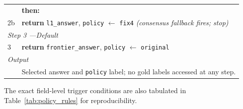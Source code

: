 \begin{table}[t]
\begin{tabular}{p{} p{}}
   & \textbf{then:} \\
2b & \quad \textbf{return} \texttt{l1\_answer}, \texttt{policy} $\leftarrow$ \texttt{fix4} \quad\quad \textit{(consensus fallback fires; stop)} \\
\midrule
\multicolumn{2}{l}{\textit{Step 3 ---Default}} \\
3  & \textbf{return} \texttt{frontier\_answer}, \texttt{policy} $\leftarrow$ \texttt{original} \\
\midrule
\multicolumn{2}{l}{\textit{Output}} \\
& Selected answer and \texttt{policy} label; no gold labels accessed at any step. \\
\bottomrule
\end{tabular}
\end{table}

The exact field-level trigger conditions are also tabulated in Table~\ref{tab:policy_rules} for reproducibility.
